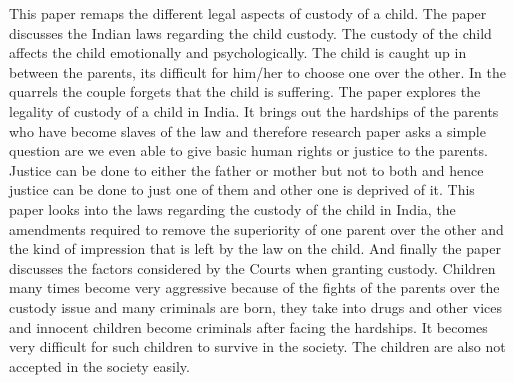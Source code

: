 \begin{multicols}{2}
\noi
This paper remaps the different legal aspects of custody of a child. The paper discusses the Indian
laws regarding the child custody. The custody of the child affects the child emotionally and
psychologically. The child is caught up in between the parents, its difficult for him/her to choose 
one over the other. In the quarrels the couple forgets that the child is suffering. The paper explores
the legality of custody of a child in India. It brings out the hardships of the parents who have
become slaves of the law and therefore research paper asks a simple question are we even able to
give basic human rights or justice to the parents. Justice can be done to either the father or mother
but not to both and hence justice can be done to just one of them and other one is deprived of it. This
paper looks into the laws regarding the custody of the child in India, the amendments required to
remove the superiority of one parent over the other and the kind of impression that is left by the
law on the child. And finally the paper discusses the factors considered by the Courts when
granting custody. Children many times become very aggressive because of the fights of the
parents over the custody issue and many criminals are born, they take into drugs and other vices
and innocent children become criminals after facing the hardships. It becomes very difficult for
such children to survive in the society. The children are also not accepted in the society easily.

\vspace{-.1cm}


\vspace{-.1cm}


\end{multicols}

